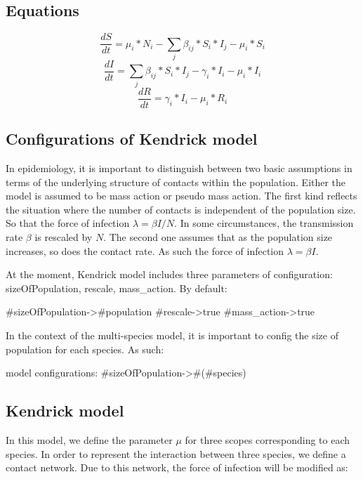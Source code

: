 \documentclass[a4paper,10pt,twoside]{book}
\begin{document}
\subsection{ Equations}

  \begin{equation}
    \frac{dS}{dt} = \mu_i*N_i - \sum_j \beta_{ij}*S_i*I_j - \mu_i*S_i
  \end{equation}
  \begin{equation}
    \frac{dI}{dt} = \sum_j \beta_{ij}*S_i*I_j - \gamma_i*I_i - \mu_i*I_i
  \end{equation}
  \begin{equation}
    \frac{dR}{dt} = \gamma_i*I_i - \mu_i*R_i
  \end{equation}
  
\subsection{ Configurations of Kendrick model}
In epidemiology, it is important to distinguish between two basic assumptions in terms of the underlying structure of contacts within the population.
Either the model is assumed to be mass action or pseudo mass action.
The first kind reflects the situation where the number of contacts is independent of the population size.
So that the force of infection  $\lambda = \beta I / N$.
In some circumstances, the transmission rate  $\beta$ is rescaled by  $N$.
The second one assumes that as the population size increases, so does the contact rate.
As such the force of infection  $\lambda = \beta I$.

At the moment, Kendrick model includes three parameters of configuration: sizeOfPopulation, rescale, mass\_action.
By default:


\begin{code}{}
#sizeOfPopulation->#population
#rescale->true
#mass_action->true
\end{code}


In the context of the multi-species model, it is important to config the size of population for each species.
As such:


\begin{code}{}
model configurations: {#sizeOfPopulation->#(#species)}
\end{code}

\subsection{ Kendrick model}
In this model, we define the parameter  $\mu$ for three scopes corresponding to each species.
In order to represent the interaction between three species, we define a contact network.
Due to this network, the force of infection will be modified as:
\end{document}
